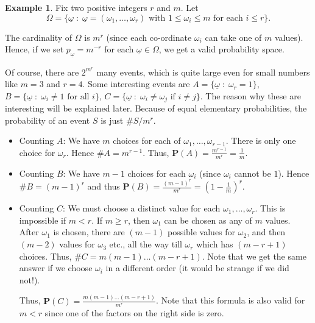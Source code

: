 \documentclass[preprint,  11pt]{amsart}
\theoremstyle{plain} %
\theoremstyle{definition} %
\newtheorem{example}[theorem]{Example}
\begin{document}
\begin{example}\label{eg:rballsinmbins} Fix two positive integers $r$ and $m$. Let 
$$\Omega=\{\underline{\omega}{\; : \;} \underline{\omega}=(\omega_{1},\ldots ,\omega_{r}) \mbox{ with }1\le \omega_{i} \le m \mbox{ for each }i\le r\}.$$

The cardinality of $\Omega$ is $m^{r}$ (since each co-ordinate $\omega_{i}$ can take one of $m$ values). Hence, if we set $p_{\underline{\omega}}=m^{-r}$ for each $\underline{\omega}\in \Omega$, we get a valid probability space. 

Of course, there are $2^{m^{r}}$ many events, which is quite large even for small numbers like $m=3$ and $r=4$. Some interesting events are $A=\{\underline{\omega} {\; : \;} \omega_{r}=1\}$, $B=\{\underline{\omega}{\; : \;} \omega_{i}\not=1 \mbox{ for all }i\}$, $C=\{\underline{\omega}{\; : \;} \omega_{i}\not=\omega_{j} \mbox{ if } i\not= j\}$. The reason why these are interesting will be explained later. Because of equal elementary probabilities, the probability of an event $S$ is just $\#S/m^{r}$.
\begin{itemize}\setlength\itemsep{3pt}
\item Counting $A$: We have $m$ choices for each of  $\omega_{1},\ldots ,\omega_{r-1}$. There is only one choice for $\omega_{r}$. Hence $\#A=m^{r-1}$. Thus, $\mathbf{P}(A)=\frac{m^{r-1}}{m^{r}} = \frac{1}{m}$.
\item Counting $B$: We have $m-1$ choices for each $\omega_{i}$ (since $\omega_{i}$ cannot be $1$). Hence $\#B=(m-1)^{r}$ and thus $\mathbf{P}(B)=\frac{(m-1)^{r}}{m^{r}}=(1-\frac{1}{m})^{r}$.
\item Counting $C$: We must choose a distinct value for each $\omega_{1},\ldots ,\omega_{r}$. This is impossible if $m<r$. If $m\ge r$, then $\omega_{1}$ can be chosen as any of $m$ values. After $\omega_{1}$ is chosen, there are $(m-1)$ possible values for $\omega_{2}$, and then $(m-2)$ values for $\omega_{3}$ etc., all the way till $\omega_{r}$ which has $(m-r+1)$ choices. Thus, $\#C=m(m-1)\ldots (m-r+1)$. Note that we get the same answer if we choose $\omega_{i}$ in a different order (it would be strange if we did not!).

Thus, $\mathbf{P}(C)=\frac{m(m-1)\ldots (m-r+1)}{m^{r}}$. Note that this formula is also valid for $m<r$ since one of the factors on the right side is zero.
\end{itemize}

\end{example}
\end{document}
